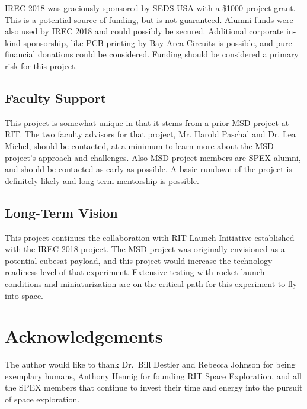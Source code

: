 \documentclass[conference]{IEEEtran} %
\begin{document}
IREC 2018 was graciously sponsored by SEDS USA with a \$1000 project grant. This is a potential source of funding, but is not guaranteed. Alumni funds were also used by IREC 2018 and could possibly be secured. Additional corporate in-kind sponsorship, like PCB printing by Bay Area Circuits is possible, and pure financial donations could be considered. Funding should be considered a primary risk for this project.

\subsection{Faculty Support}
This project is somewhat unique in that it stems from a prior MSD project at RIT. The two faculty advisors for that project, Mr. Harold Paschal and Dr. Lea Michel, should be contacted, at a minimum to learn more about the MSD project’s approach and challenges. Also MSD project members are SPEX alumni, and should be contacted as early as possible. A basic rundown of the project is definitely likely and long term mentorship is possible.

\subsection{Long-Term Vision}
\label{sec:vision}
This project continues the collaboration with RIT Launch Initiative established with the IREC 2018 project. The MSD project was originally envisioned as a potential cubesat payload, and this project would increase the technology readiness level of that experiment. Extensive testing with rocket launch conditions and miniaturization are on the critical path for this experiment to fly into space.

\section*{Acknowledgements}
The author would like to thank Dr.~Bill Destler and Rebecca Johnson for being exemplary humans, Anthony Hennig for founding RIT Space Exploration, and all the SPEX members that continue to invest their time and energy into the pursuit of space exploration.



\end{document}
